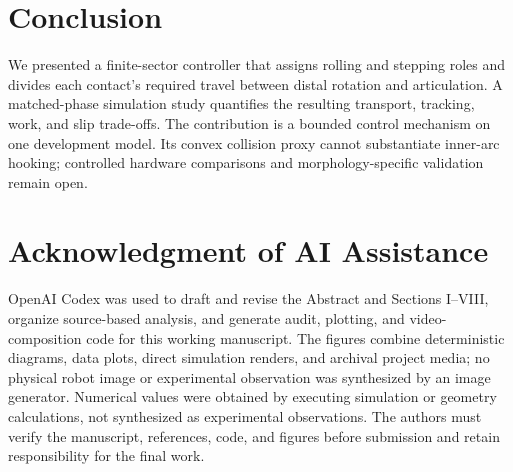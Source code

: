 \documentclass[letterpaper,10pt,conference]{ieeeconf}
\begin{document}
\section{Conclusion}
We presented a finite-sector controller that assigns rolling and stepping roles and divides each contact's required travel between distal rotation and articulation. A matched-phase simulation study quantifies the resulting transport, tracking, work, and slip trade-offs. The contribution is a bounded control mechanism on one development model. Its convex collision proxy cannot substantiate inner-arc hooking; controlled hardware comparisons and morphology-specific validation remain open.

\noindent\begin{minipage}{\columnwidth}
\section*{Acknowledgment of AI Assistance}
OpenAI Codex was used to draft and revise the Abstract and Sections I--VIII, organize source-based analysis, and generate audit, plotting, and video-composition code for this working manuscript. The figures combine deterministic diagrams, data plots, direct simulation renders, and archival project media; no physical robot image or experimental observation was synthesized by an image generator. Numerical values were obtained by executing simulation or geometry calculations, not synthesized as experimental observations. The authors must verify the manuscript, references, code, and figures before submission and retain responsibility for the final work.

\end{minipage}



\end{document}
